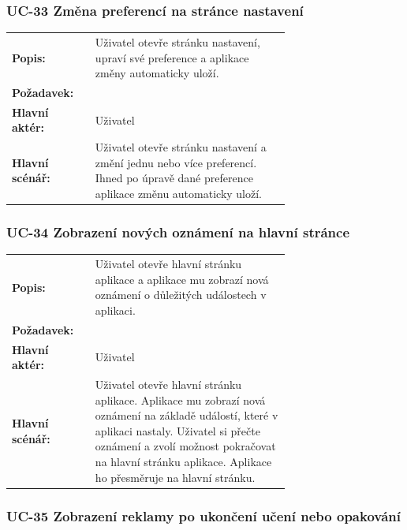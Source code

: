 \subsubsection{UC-33 Změna preferencí na stránce nastavení}

\begin{tabular}{lp{0.7\linewidth}}
  \textbf{Popis:} & Uživatel otevře stránku nastavení, upraví své preference a aplikace změny automaticky uloží. \\
  \textbf{Požadavek:} & \nameref{sec:fp-settings-page} \\
  \textbf{Hlavní aktér:} & Uživatel \\
  \textbf{Hlavní scénář:} & Uživatel otevře stránku nastavení a změní jednu nebo více preferencí. Ihned po úpravě dané preference aplikace změnu automaticky uloží. \\
\end{tabular}

\subsubsection{UC-34 Zobrazení nových oznámení na hlavní stránce}

\begin{tabular}{lp{0.7\linewidth}}
  \textbf{Popis:} & Uživatel otevře hlavní stránku aplikace a aplikace mu zobrazí nová oznámení o důležitých událostech v aplikaci. \\
  \textbf{Požadavek:} & \nameref{sec:fp-extended-notifications} \\
  \textbf{Hlavní aktér:} & Uživatel \\
  \textbf{Hlavní scénář:} & Uživatel otevře hlavní stránku aplikace. Aplikace mu zobrazí nová oznámení na základě událostí, které v aplikaci nastaly. Uživatel si přečte oznámení a zvolí možnost pokračovat na hlavní stránku aplikace. Aplikace ho přesměruje na hlavní stránku. \\
\end{tabular}

\subsubsection{UC-35 Zobrazení reklamy po ukončení učení nebo opakování}

